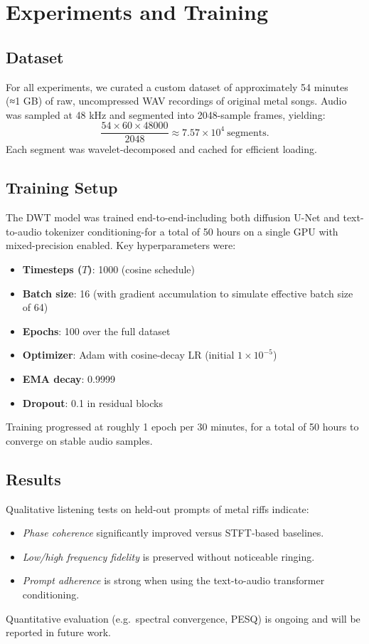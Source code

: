 \documentclass[12pt]{report}
\begin{document}
\chapter{Experiments and Training}

\section{Dataset}
For all experiments, we curated a custom dataset of approximately 54 minutes (≈1 GB) of raw, uncompressed WAV recordings of original metal songs. Audio was sampled at 48 kHz and segmented into 2048-sample frames, yielding:
\[
\frac{54 \times 60 \times 48000}{2048} \approx 7.57\times10^4\ \text{segments}.
\]
Each segment was wavelet-decomposed and cached for efficient loading.

\section{Training Setup}
The DWT model was trained end-to-end-including both diffusion U-Net and text-to-audio tokenizer conditioning-for a total of 50 hours on a single GPU with mixed-precision enabled. Key hyperparameters were:
\begin{itemize}
  \item \textbf{Timesteps ($T$)}: 1000 (cosine schedule)
  \item \textbf{Batch size}: 16 (with gradient accumulation to simulate effective batch size of 64)
  \item \textbf{Epochs}: 100 over the full dataset
  \item \textbf{Optimizer}: Adam with cosine-decay LR (initial $1\times10^{-5}$)
  \item \textbf{EMA decay}: 0.9999
  \item \textbf{Dropout}: 0.1 in residual blocks
\end{itemize}
Training progressed at roughly 1 epoch per 30 minutes, for a total of 50 hours to converge on stable audio samples.

\section{Results}
Qualitative listening tests on held-out prompts of metal riffs indicate:
\begin{itemize}
  \item \emph{Phase coherence} significantly improved versus STFT‐based baselines.
  \item \emph{Low/high frequency fidelity} is preserved without noticeable ringing.
  \item \emph{Prompt adherence} is strong when using the text-to-audio transformer conditioning.
\end{itemize}
Quantitative evaluation (e.g.\ spectral convergence, PESQ) is ongoing and will be reported in future work.
\end{document}
